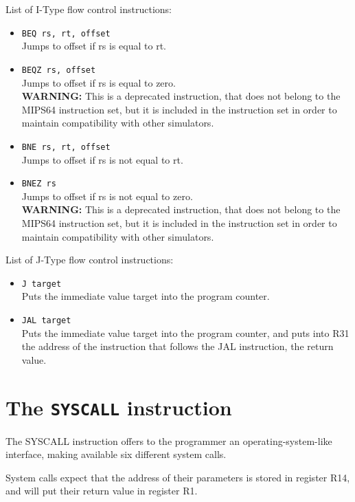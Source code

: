 \documentclass[12pt]{report}
\newcommand{\MS}{MIPS64}
\newcommand{\WARN}{\textbf{WARNING:} This is a deprecated instruction, that
does not belong to the \MS{} instruction set, but it is included in the instruction
set in order to maintain compatibility with other simulators.}
\begin{document}
List of I-Type flow control instructions:

\begin{itemize}
	\item \texttt{BEQ rs, rt, offset}\\
	Jumps to offset if rs is equal to rt.

	\item \texttt{BEQZ rs, offset}\\
	Jumps to offset if rs is equal to zero.\\
	\WARN

	\item \texttt{BNE rs, rt, offset}\\
	Jumps to offset if rs is not equal to rt.

	\item \texttt{BNEZ rs}\\
	Jumps to offset if rs is not equal to zero.\\
	\WARN
\end{itemize}

List of J-Type flow control instructions:

\begin{itemize}
	\item \texttt{J target}\\
	Puts the immediate value target into the program counter.

	\item \texttt{JAL target}\\
	Puts the immediate value target into the program counter, and puts into R31 the
	address of the instruction that follows the JAL instruction, the return
	value.
\end{itemize}

\section{The \texttt{SYSCALL} instruction}
\label{sysc-man}
The SYSCALL instruction offers to the programmer an operating-system-like
interface, making available six different system calls.

System calls expect that the address of their parameters is stored in register
R14, and will put their return value in register R1.
\end{document}
